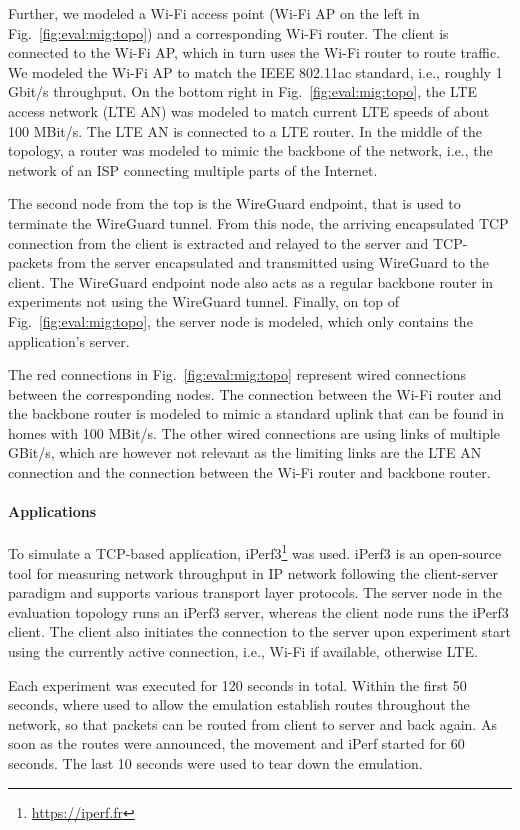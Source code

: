 Further, we modeled a Wi-Fi access point (Wi-Fi AP on the left in Fig.~\ref{fig:eval:mig:topo}) and a corresponding Wi-Fi router.
The client is connected to the Wi-Fi AP, which in turn uses the Wi-Fi router to route traffic.
We modeled the Wi-Fi AP to match the IEEE 802.11ac standard, i.e., roughly 1 Gbit/s throughput.
On the bottom right in Fig.~\ref{fig:eval:mig:topo}, the LTE access network (LTE AN) was modeled to match current LTE speeds of about 100 MBit/s.
The LTE AN is connected to a LTE router.
In the middle of the topology, a router was modeled to mimic the backbone of the network, i.e., the network of an ISP connecting multiple parts of the Internet.

The second node from the top is the WireGuard endpoint, that is used to terminate the WireGuard tunnel.
From this node, the arriving encapsulated TCP connection from the client is extracted and relayed to the server and TCP-packets from the server encapsulated and transmitted using WireGuard to the client.
The WireGuard endpoint node also acts as a regular backbone router in experiments not using the WireGuard tunnel.
Finally, on top of Fig.~\ref{fig:eval:mig:topo}, the server node is modeled, which only contains the application's server.

The red connections in Fig.~\ref{fig:eval:mig:topo} represent wired connections between the corresponding nodes.
The connection between the Wi-Fi router and the backbone router is modeled to mimic a standard uplink that can be found in homes with 100 MBit/s.
The other wired connections are using links of multiple GBit/s, which are however not relevant as the limiting links are the LTE AN connection and the connection between the Wi-Fi router and backbone router.

\paragraph{Applications}
To simulate a TCP-based application, iPerf3\footnote{\url{https://iperf.fr}} was used.
iPerf3 is an open-source tool for measuring network throughput in IP network following the client-server paradigm and supports various transport layer protocols.
The server node in the evaluation topology runs an iPerf3 server, whereas the client node runs the iPerf3 client.
The client also initiates the connection to the server upon experiment start using the currently active connection, i.e., Wi-Fi if available, otherwise LTE.

Each experiment was executed for 120 seconds in total.
Within the first 50 seconds, where used to allow the emulation establish routes throughout the network, so that packets can be routed from client to server and back again.
As soon as the routes were announced, the movement and iPerf started for 60 seconds.
The last 10 seconds were used to tear down the emulation.

